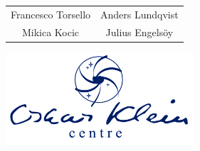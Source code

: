 \documentclass[11pt,a4paper]{article}
\begin{document}
\centering
\begin{table}[H]
\arraycolsep=1.5cm
	\centering
	\begin{tabular}{cc}
	\Large Francesco Torsello & \Large Anders Lundqvist \\
	\Large Mikica Kocic & \Large Julius Engelsöy \\
	\end{tabular}
\end{table}
\includegraphics[width=7cm]{OKlogo_blue-500px.jpg}
\end{document}
